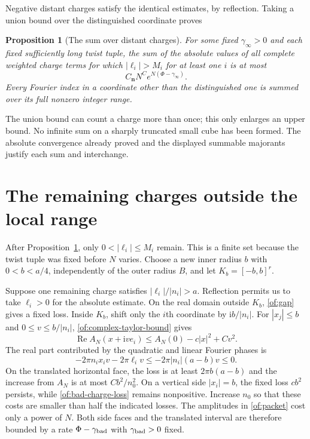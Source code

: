 \documentclass[11pt]{article}
\numberwithin{equation}{section}
\newtheorem{proposition}[theorem]{Proposition}
\theoremstyle{definition}\newtheorem{definition}[theorem]{Definition}
\theoremstyle{remark}\newtheorem{remark}[theorem]{Remark}
\newcommand{\ii}{\mathrm i}
\newcommand{\Rea}{\operatorname{Re}}
\begin{document}
Negative distant charges satisfy the identical estimates, by reflection.
Taking a union bound over the distinguished coordinate proves
\begin{proposition}[The sum over distant charges]\label{of:far}
For some fixed $\gamma_\infty>0$ and each fixed sufficiently long
twist tuple, the sum of the absolute values of all complete weighted
charge terms for which $|\ell_i|>M_i$ for at least one $i$ is at most
\[
            C_{\boldsymbol n}N^C e^{N(\Phi-\gamma_\infty)}.
\]
Every Fourier index in a coordinate other than the distinguished one
is summed over its full nonzero integer range.
\end{proposition}

The union bound can count a charge more than once; this only enlarges
an upper bound. No infinite sum on a sharply truncated small cube has
been formed. The absolute convergence already proved and the displayed
summable majorants justify each sum and interchange.

\section{The remaining charges outside the local range}

After Proposition~\ref{of:far}, only
$0<|\ell_i|\le M_i$ remain. This is a finite set because the twist
tuple was fixed before $N$ varies. Choose a new inner radius $b$ with
$0<b<a/4$, independently of the outer radius $B$, and let
$K_b=[-b,b]^r$.

Suppose one remaining charge satisfies $|\ell_i|/|n_i|>a$.
Reflection permits us to take $\ell_i>0$ for the absolute estimate.
On the real domain outside $K_b$, \eqref{of:gap} gives a fixed loss.
Inside $K_b$, shift only the $i$th coordinate by $\ii b/|n_i|$.
For $|x_j|\le b$ and $0\le v\le b/|n_i|$,
\eqref{of:complex-taylor-bound} gives
\[
 \Rea A_N(x+\ii ve_i)\le A_N(0)-c|x|^2+Cv^2.
\]
The real part contributed by the quadratic and linear Fourier phases is
\begin{equation}\label{of:bad-charge-loss}
 -2\pi n_ix_iv-2\pi\ell_iv
                  \le-2\pi|n_i|(a-b)v\le0.
\end{equation}
On the translated horizontal face, the loss is at least
$2\pi b(a-b)$ and the increase from $A_N$ is at most $Cb^2/n_0^2$.
On a vertical side $|x_i|=b$, the fixed loss $cb^2$ persists,
while \eqref{of:bad-charge-loss} remains nonpositive. Increase
$n_0$ so that these costs are smaller than half the indicated losses.
The amplitudes in \eqref{of:packet} cost only a power of $N$.
Both side faces and the translated interval are therefore bounded
by a rate $\Phi-\gamma_{\rm bad}$ with $\gamma_{\rm bad}>0$ fixed.
\end{document}
